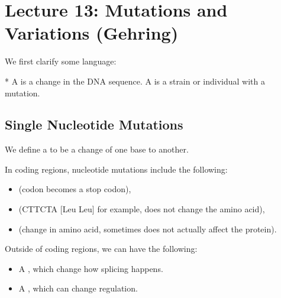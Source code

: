 \section*{Lecture 13: Mutations and Variations (Gehring)}
\setcounter{section}{13}

We first clarify some language:

\begin{defn}*
	A  is a change in the DNA sequence. A  is a strain or individual with a mutation.
\end{defn}

\subsection{Single Nucleotide Mutations}

\begin{defn}
	We define a  to be a change of one base to another. 
\end{defn}

\begin{exm}
	In coding regions, nucleotide mutations include the following:
	\begin{itemize}
		\item {} (codon becomes a stop codon),
		\item {} (CTT\to CTA [Leu \to Leu] for example, does not change the amino acid),
		\item {} (change in amino acid, sometimes does not actually affect the protein).
	\end{itemize}
\end{exm}

\begin{exm}
	Outside of coding regions, we can have the following:
	\begin{itemize}
		\item A , which change how splicing happens.
		\item A , which can change regulation. 
	\end{itemize}
\end{exm}

